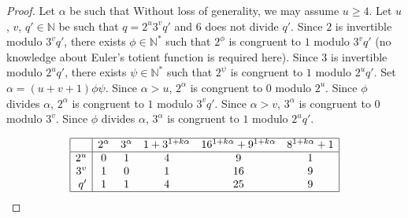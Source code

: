 \documentclass[12pt]{article}
\newcommand{\bN}{\mathbb{N}} %
\newcommand{\bNast}{\bN^*}
\theoremstyle{definition}
\begin{document}
  \begin{proof}

      
    Let $\alpha$ be such that 
    Without loss of generality, we may assume $u \ge 4$.
    Let $u$, $v$, $q' \in \bN$ be such that $q = 2^u 3^v q'$ and $6$ does not divide $q'$.
    Since $2$ is invertible modulo $3^v q'$,
    there exists $\phi \in \bNast$ such that $2^\phi$ is congruent to $1$ modulo $3^v q'$
    (no knowledge about Euler's totient function is required here).
    Since $3$ is invertible modulo $2^u q'$,
    there exists $\psi \in \bNast$ such that $2^\psi$ is congruent to $1$ modulo $2^u q'$.
    Set $\alpha = (u + v + 1)\phi \psi$.
    Since $\alpha > u$,
    $2^\alpha$ is congruent to $0$ modulo $2^u$.
    Since $\phi$ divides $\alpha$, 
    $2^\alpha$ is congruent to $1$ modulo $3^v q'$.
    Since $\alpha > v$,
    $3^\alpha$ is congruent to $0$ modulo $3^v$.
    Since $\phi$ divides $\alpha$,
    $3^\alpha$ is congruent to $1$ modulo $2^u q'$. 
       
    
     $$
     \begin{array}{|r|ccccc|}
       \hline 
       & 2^\alpha & 3^\alpha & 1 + 3^{1 + k \alpha} & 16^{1 + k \alpha} + 9^{1 + k \alpha} & 8^{1 + k \alpha} + 1 \\
    \hline                                                                                     
       2^u &  0 &  1 & 4 & 9 &  1 \\
       3^v &  1 &  0 & 1 & 16 & 9 \\
       q'  &  1 &  1 & 4 & 25 & 9 \\
        \hline 
     \end{array} 
     $$
        
    
    

\end{proof}
\end{document}
